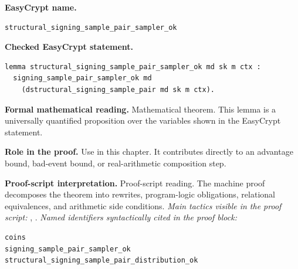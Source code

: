 \begin{formaltheorem}
\noindent\textbf{EasyCrypt name.}
\begin{lstlisting}[language=EasyCrypt,basicstyle=\ttfamily\scriptsize]
structural_signing_sample_pair_sampler_ok
\end{lstlisting}
\noindent\textbf{Checked EasyCrypt statement.}
\begin{lstlisting}[language=EasyCrypt,basicstyle=\ttfamily\scriptsize]
lemma structural_signing_sample_pair_sampler_ok md sk m ctx :
  signing_sample_pair_sampler_ok md
    (dstructural_signing_sample_pair md sk m ctx).
\end{lstlisting}
\noindent\textbf{Formal mathematical reading.}
Mathematical theorem. This lemma is a universally quantified proposition over the variables shown in the EasyCrypt statement.

\noindent\textbf{Role in the proof.}
Use in this chapter. It contributes directly to an advantage bound, bad-event bound, or real-arithmetic composition step.

\noindent\textbf{Proof-script interpretation.}
Proof-script reading. The machine proof decomposes the theorem into rewrites, program-logic obligations, relational equivalences, and arithmetic side conditions.
\emph{Main tactics visible in the proof script:} , .
\emph{Named identifiers syntactically cited in the proof block:}
\begin{lstlisting}[language=EasyCrypt,basicstyle=\ttfamily\scriptsize]
coins
signing_sample_pair_sampler_ok
structural_signing_sample_pair_distribution_ok
\end{lstlisting}

\end{formaltheorem}


